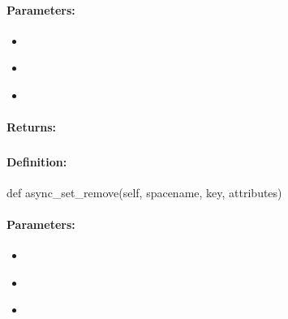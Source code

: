 \paragraph{Parameters:}
\begin{itemize}[noitemsep]
\item {}\\

\item {}\\

\item {}\\

\end{itemize}

\paragraph{Returns:}


\pagebreak
\subsubsection{}
\label{api:python:async_set_remove}


\paragraph{Definition:}
\begin{pythoncode}
def async_set_remove(self, spacename, key, attributes)
\end{pythoncode}

\paragraph{Parameters:}
\begin{itemize}[noitemsep]
\item {}\\

\item {}\\

\item {}\\

\end{itemize}

